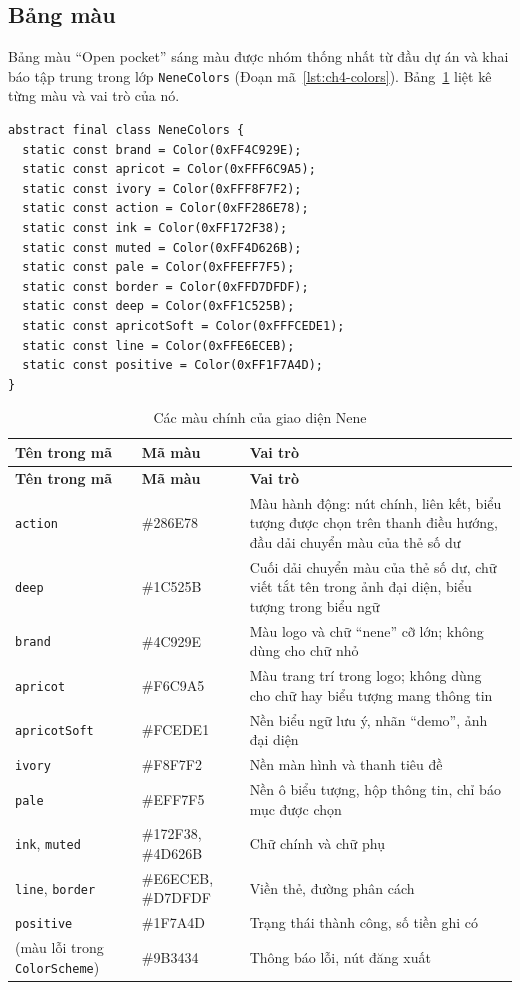 \subsection{Bảng màu}
\label{sec:ch4-palette}

Bảng màu ``Open pocket'' sáng màu được nhóm thống nhất từ đầu dự án và khai báo tập trung trong lớp \texttt{NeneColors} (Đoạn mã~\ref{lst:ch4-colors}). Bảng~\ref{tab:ch4-palette} liệt kê từng màu và vai trò của nó.

\begin{lstlisting}[caption={Khai báo bảng màu trong \texttt{nene\_\allowbreak{}brand.\allowbreak{}dart}},label={lst:ch4-colors}]
abstract final class NeneColors {
  static const brand = Color(0xFF4C929E);
  static const apricot = Color(0xFFF6C9A5);
  static const ivory = Color(0xFFF8F7F2);
  static const action = Color(0xFF286E78);
  static const ink = Color(0xFF172F38);
  static const muted = Color(0xFF4D626B);
  static const pale = Color(0xFFEFF7F5);
  static const border = Color(0xFFD7DFDF);
  static const deep = Color(0xFF1C525B);
  static const apricotSoft = Color(0xFFFCEDE1);
  static const line = Color(0xFFE6ECEB);
  static const positive = Color(0xFF1F7A4D);
}
\end{lstlisting}

\begin{longtable}{@{}p{}p{}p{}@{}}
\caption{Các màu chính của giao diện Nene}\label{tab:ch4-palette}\\
\toprule
\textbf{Tên trong mã} & \textbf{Mã màu} & \textbf{Vai trò}\\
\midrule
\endfirsthead
\toprule
\textbf{Tên trong mã} & \textbf{Mã màu} & \textbf{Vai trò}\\
\midrule
\endhead
\bottomrule
\endlastfoot
\texttt{action} & \#286E78 & Màu hành động: nút chính, liên kết, biểu tượng được chọn trên thanh điều hướng, đầu dải chuyển màu của thẻ số dư\\
\texttt{deep} & \#1C525B & Cuối dải chuyển màu của thẻ số dư, chữ viết tắt tên trong ảnh đại diện, biểu tượng trong biểu ngữ\\
\texttt{brand} & \#4C929E & Màu logo và chữ ``nene'' cỡ lớn; không dùng cho chữ nhỏ\\
\texttt{apricot} & \#F6C9A5 & Màu trang trí trong logo; không dùng cho chữ hay biểu tượng mang thông tin\\
\texttt{apricotSoft} & \#FCEDE1 & Nền biểu ngữ lưu ý, nhãn ``demo'', ảnh đại diện\\
\texttt{ivory} & \#F8F7F2 & Nền màn hình và thanh tiêu đề\\
\texttt{pale} & \#EFF7F5 & Nền ô biểu tượng, hộp thông tin, chỉ báo mục được chọn\\
\texttt{ink}, \texttt{muted} & \#172F38, \#4D626B & Chữ chính và chữ phụ\\
\texttt{line}, \texttt{border} & \#E6ECEB, \#D7DFDF & Viền thẻ, đường phân cách\\
\texttt{positive} & \#1F7A4D & Trạng thái thành công, số tiền ghi có\\
(màu lỗi trong \texttt{ColorScheme}) & \#9B3434 & Thông báo lỗi, nút đăng xuất\\
\end{longtable}

